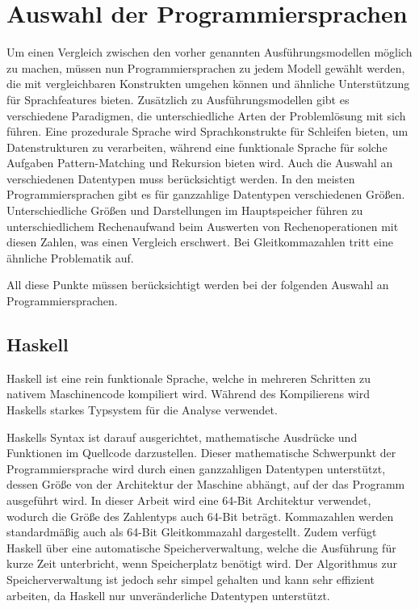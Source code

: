 \documentclass[11pt, parskip=half]{scrartcl}       %
\begin{document}
\section{Auswahl der Programmiersprachen}

Um einen Vergleich zwischen den vorher genannten Ausführungsmodellen möglich zu machen, müssen nun Programmiersprachen zu jedem Modell gewählt werden, die mit vergleichbaren Konstrukten umgehen können und ähnliche Unterstützung für Sprachfeatures bieten.
Zusätzlich zu Ausführungsmodellen gibt es verschiedene Paradigmen, die unterschiedliche Arten der Problemlösung mit sich führen.
Eine prozedurale Sprache wird Sprachkonstrukte für Schleifen bieten, um Datenstrukturen zu verarbeiten, während eine funktionale Sprache für solche Aufgaben Pattern-Matching und Rekursion bieten wird.
Auch die Auswahl an verschiedenen Datentypen muss berücksichtigt werden.
In den meisten Programmiersprachen gibt es für ganzzahlige Datentypen verschiedenen Größen.
Unterschiedliche Größen und Darstellungen im Hauptspeicher führen zu unterschiedlichem Rechenaufwand beim Auswerten von Rechenoperationen mit diesen Zahlen, was einen Vergleich erschwert.
Bei Gleitkommazahlen tritt eine ähnliche Problematik auf.\cite{arxiv_comparative_study_of_languages}

All diese Punkte müssen berücksichtigt werden bei der folgenden Auswahl an Programmiersprachen.

\subsection{Haskell}

Haskell ist eine rein funktionale Sprache\cite{haskell_language}, welche in mehreren Schritten zu nativem Maschinencode kompiliert wird.\cite{haskell_code_generation}
Während des Kompilierens wird Haskells starkes Typsystem für die Analyse verwendet.

Haskells Syntax ist darauf ausgerichtet, mathematische Ausdrücke und Funktionen im Quellcode darzustellen.
Dieser mathematische Schwerpunkt der Programmiersprache wird durch einen ganzzahligen Datentypen unterstützt, dessen Größe von der Architektur der Maschine abhängt, auf der das Programm ausgeführt wird.
In dieser Arbeit wird eine 64-Bit Architektur verwendet, wodurch die Größe des Zahlentyps auch 64-Bit beträgt.
Kommazahlen werden standardmäßig auch als 64-Bit Gleitkommazahl dargestellt.
Zudem verfügt Haskell über eine automatische Speicherverwaltung, welche die Ausführung für kurze Zeit unterbricht, wenn Speicherplatz benötigt wird.\cite{haskell_garbage_collection}
Der Algorithmus zur Speicherverwaltung ist jedoch sehr simpel gehalten und kann sehr effizient arbeiten, da Haskell nur unveränderliche Datentypen unterstützt.
\end{document}
